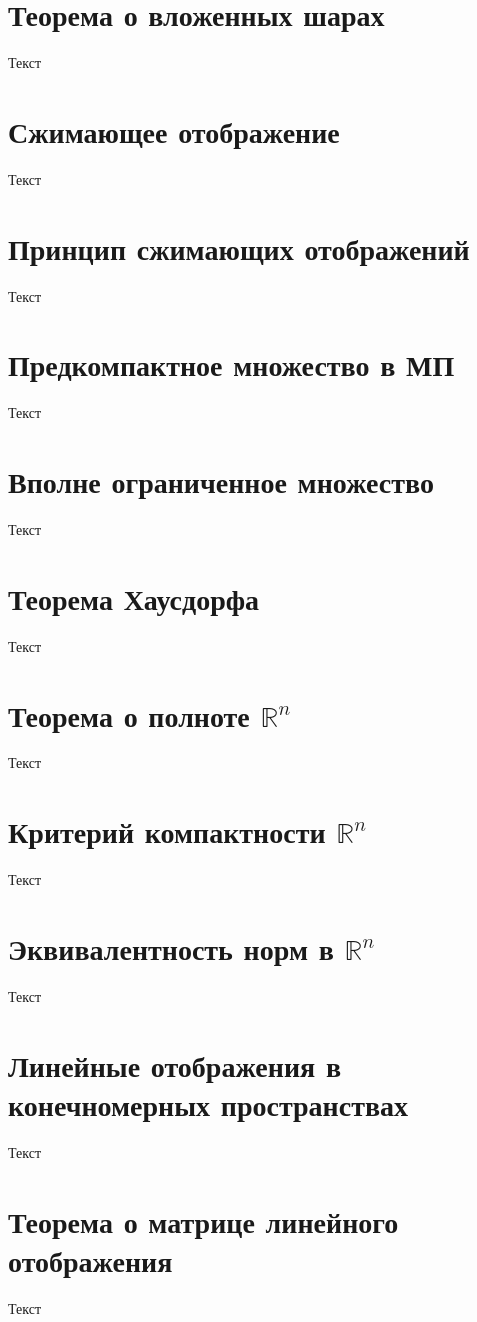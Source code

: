 \documentclass{report}
\theoremstyle{definition}
\begin{document}
\section{Теорема о вложенных шарах}
Текст

\section{Сжимающее отображение}
Текст

\section{Принцип сжимающих отображений}
Текст

\section{Предкомпактное множество в МП}
Текст

\section{Вполне ограниченное множество}
Текст

\section{Теорема Хаусдорфа}
Текст

\section{Теорема о полноте $\mathbb{R}^n$}
Текст

\section{Критерий компактности $\mathbb{R}^n$}
Текст

\section{Эквивалентность норм в $\mathbb{R}^n$}
Текст

\section{Линейные отображения в конечномерных пространствах}
Текст

\section{Теорема о матрице линейного отображения}
Текст
\end{document}
